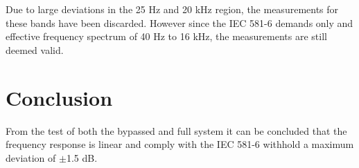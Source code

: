 Due to large deviations in the 25 Hz and 20 kHz region, the measurements for these bands have been discarded. However since the IEC 581-6 demands only and effective frequency spectrum of 40 Hz to 16 kHz, the measurements are still deemed valid.

\section{Conclusion}
From the test of both the bypassed and full system it can be concluded that the frequency response is linear and comply with the IEC 581-6 withhold a maximum deviation of $\pm$1.5 dB.